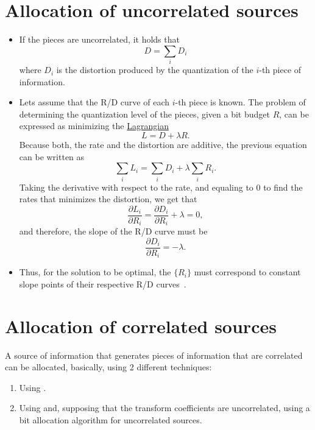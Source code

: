 \section{Allocation of uncorrelated sources}
\begin{itemize}

\item
  If the pieces are uncorrelated, it holds that
  \begin{equation}
    D=\sum_i D_i
  \end{equation}
  where $D_i$ is the distortion produced by the quantization of the
  $i$-th piece of information.

\item
  Lets assume that the R/D curve of each $i$-th piece is known. The
  problem of determining the quantization level of the pieces, given a
  bit budget $R$, can be expressed as minimizing the
  \href{https://en.wikipedia.org/wiki/Lagrange_multiplier}{Lagrangian}
  \begin{equation}
    L = D+\lambda R.
  \end{equation}
  Because both, the rate and the distortion are additive, the previous
  equation can be written as
  \begin{equation}
    \sum_i L_i = \sum_i D_i + \lambda\sum_i R_i.
  \end{equation}
  Taking the derivative with respect to the rate, and equaling to $0$
  to find the rates that minimizes the distortion, we get that
  \begin{equation*}
    \frac{\partial L_i}{\partial R_i} = \frac{\partial D_i}{\partial R_i} + \lambda = 0,
  \end{equation*}
  and therefore, the slope of the R/D curve must be
  \begin{equation}
    \frac{\partial D_i}{\partial R_i} = -\lambda.
  \end{equation}

\item 
  Thus, for the solution to be optimal, the $\{R_i\}$ must correspond
  to constant slope points of their respective R/D
  curves~\cite{vetterli1995wavelets}.

\end{itemize}
  
  
\section{Allocation of correlated sources}
A source of information that generates pieces of information that are
correlated can be allocated, basically, using 2 different techniques:
\begin{enumerate}
\item Using .
\item Using  and, supposing
  that the transform coefficients are uncorrelated, using a bit
  allocation algorithm for uncorrelated sources.
\end{enumerate}



